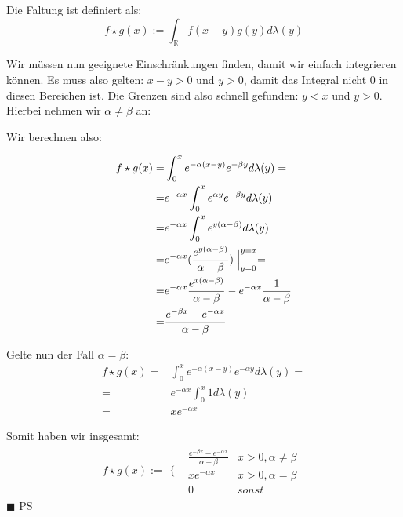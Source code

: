 \documentclass[a4paper,11pt]{article}
\numberwithin{satz}{subsection}
\newenvironment{proof}[1][]
{%
  \noindent{\bf\textit{Beweis:}}
}
{%
  \hfill$\blacksquare$ PS
  \bigskip
}
\newcommand{\R}{\mathbb{R}}
\begin{document}
\begin{proof}
	Die Faltung ist definiert als:
	\begin{equation*}
	f \star g(x) := \int_{\R} f(x-y) g(y) d\lambda(y)
	\end{equation*}
	
	 Wir müssen nun geeignete Einschränkungen finden, damit wir einfach integrieren können. Es muss also gelten: $x -y  > 0$ und $y > 0$, damit das Integral nicht 0 in diesen Bereichen ist. Die Grenzen sind also schnell gefunden: $y < x$ und $y > 0$. Hierbei nehmen wir $\alpha \ne \beta$ an:
	 
	 Wir berechnen also:
	 
	 \begin{equation*}
	 \begin{split}
	 f \star g (x) = & \int_{0}^{x} e^{-\alpha (x - y)} e^{-\beta y} d\lambda(y) = \\
	 = & e^{-\alpha x} \int_{0}^{x} e^{\alpha y} e^{-\beta y} d\lambda(y)\\
	 = & e^{-\alpha x} \int_{0}^{x} e^{y (\alpha - \beta)} d\lambda(y)\\
	 = & e^{-\alpha x} (\frac{e^{y (\alpha - \beta)}}{\alpha - \beta}) \Bigm|_{y=0}^{y=x} = \\
	 = & e^{-\alpha x} \frac{e^{x (\alpha - \beta)}}{\alpha - \beta} - e^{-\alpha x} \frac{1}{\alpha - \beta} \\
	 = & \frac{e^{-\beta x} - e^{-\alpha x}}{\alpha - \beta}
	 \end{split}
	 \end{equation*}
	 
	 Gelte nun der Fall $\alpha = \beta$:
	 \begin{equation*}
	 \begin{split}
	 f \star g (x) = & \int_{0}^{x} e^{-\alpha (x - y)} e^{-\alpha y} d\lambda(y) = \\
	 = & e^{-\alpha x} \int_{0}^{x} 1 d\lambda(y)\\
	 = & x e^{-\alpha x}
	 \end{split}
	 \end{equation*}
	 
	 
	 Somit haben wir insgesamt:
	 \begin{equation*}
	 f \star g(x) := \begin{array}{cc}
	 \Bigg\{ & \begin{array}{cc}
	 \frac{e^{-\beta x} - e^{-\alpha x}}{\alpha - \beta} & x > 0, \alpha \ne \beta  \\
	 x e^{-\alpha x} & x > 0, \alpha = \beta \\
	 0 & sonst
	 \end{array}
	 \end{array}
	 \end{equation*}
\end{proof}
\end{document}
